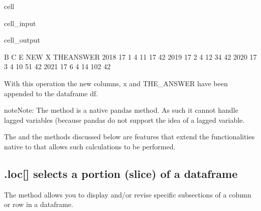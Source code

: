 \documentclass[letterpaper,10pt,english]{jupyterBook}
\begin{document}
\begin{sphinxuseclass}{cell}\begin{sphinxVerbatimInput}

\begin{sphinxuseclass}{cell_input}
\begin{sphinxVerbatim}[commandchars=\\\{\}]
\end{sphinxVerbatim}

\end{sphinxuseclass}\end{sphinxVerbatimInput}
\begin{sphinxVerbatimOutput}

\begin{sphinxuseclass}{cell_output}
\begin{sphinxVerbatim}[commandchars=\\\{\}]
       B  C  E  NEW    X  THE\PYGZus{}ANSWER
2018  17  1  4   11   17          42
2019  17  2  4   12   34          42
2020  17  3  4   10   51          42
2021  17  6  4   14  102          42
\end{sphinxVerbatim}

\end{sphinxuseclass}\end{sphinxVerbatimOutput}

\end{sphinxuseclass}
\sphinxAtStartPar
With this operation the new columns, x and THE\_ANSWER have been appended to the dataframe df.

\begin{sphinxadmonition}{note}{Note:}
\sphinxAtStartPar
The  method is a native pandas method.  As such it cannot handle lagged variables (because pandas do not support the idea of a lagged variable.

\sphinxAtStartPar
The  and the  methods discussed below are  features that extend the functionalities native to  that allows such calculations to be performed.
\end{sphinxadmonition}


\subsection{.loc{[}{]} selects a portion (slice) of a dataframe}
\label{\detokenize{content/04_PythonEssentials/PythonPandasDataframes:loc-selects-a-portion-slice-of-a-dataframe}}
\sphinxAtStartPar
The  method allows you to display and/or revise specific sub\sphinxhyphen{}sections of a column or row in a dataframe.
\end{document}
